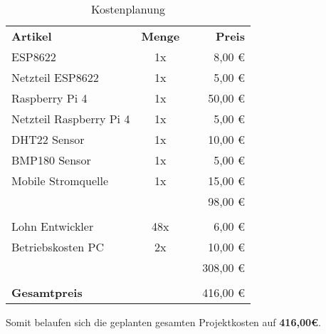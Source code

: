 \begin{table} [h]
	\centering
	\caption{Kostenplanung}
	\begin{tabularx}{\textwidth}{l c X r}
		\textbf{Artikel} & \textbf{Menge} & & \textbf{Preis} \\
		ESP8622 & 1x & & 8,00 € \\
		Netzteil ESP8622 & 1x & & 5,00 € \\
		Raspberry Pi 4 & 1x & & 50,00 € \\
		Netzteil Raspberry Pi 4 & 1x & & 5,00 € \\
		DHT22 Sensor & 1x & & 10,00 € \\
		BMP180 Sensor & 1x & & 5,00 € \\
		Mobile Stromquelle & 1x & & 15,00 € \\\cline{3-4}
		& & & 98,00 €\\
		& & & \\
		\hline
		Lohn Entwickler & 48x & & 6,00 € \\
		Betriebskosten PC & 2x & & 10,00 € \\\cline{3-4}
		& & & 308,00 € \\
		& & & \\
		\hline
		\textbf{Gesamtpreis} & & & 416,00 € \\\cline{3-4}
		\hline
		\hline
	\end{tabularx}
\end{table}

Somit belaufen sich die geplanten gesamten Projektkosten auf \textbf{416,00\euro{}}.